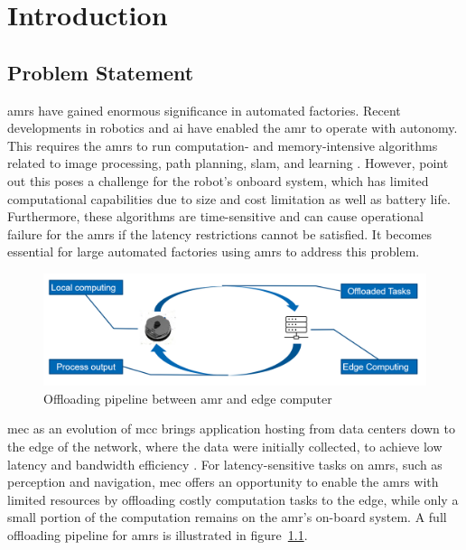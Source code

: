 \chapter{Introduction}\label{ch:introduction}

\section{Problem Statement}\label{sec:introduction:problem_statement}

\glspl{amr} have gained enormous significance in automated factories. Recent developments in robotics and \gls{ai} have enabled the \gls{amr} to operate with autonomy. This requires the \glspl{amr} to run computation- and memory-intensive algorithms related to image processing, path planning, \gls{slam}, and learning \cite{Saeik2021}. However, \citeauthor*{Baxi2022} point out this poses a challenge for the robot's onboard system, which has limited computational capabilities due to size and cost limitation as well as battery life. Furthermore, these algorithms are time-sensitive and can cause operational failure for the \glspl{amr} if the latency restrictions cannot be satisfied. It becomes essential for large automated factories using \glspl{amr} to address this problem. 


\begin{figure}[htb]
    \centering

    \includegraphics[width=0.8\linewidth]{figures/setup/amr_offloading.png}
    \caption{Offloading pipeline between \gls{amr} and edge computer}

    \label{fig:amr_offloading}
\end{figure}

\gls{mec} as an evolution of \gls*{mcc} brings application hosting from data centers down to the edge of the network, where the data were initially collected, to achieve low latency and bandwidth efficiency \cite{Lin2019}. For latency-sensitive tasks on \glspl{amr}, such as perception and navigation, \gls{mec} offers an opportunity to enable the \glspl{amr} with limited resources by offloading costly computation tasks to the edge, while only a small portion of the computation remains on the \gls{amr}'s on-board system. A full offloading pipeline for \glspl{amr} is illustrated in figure~\cref{fig:amr_offloading}.


